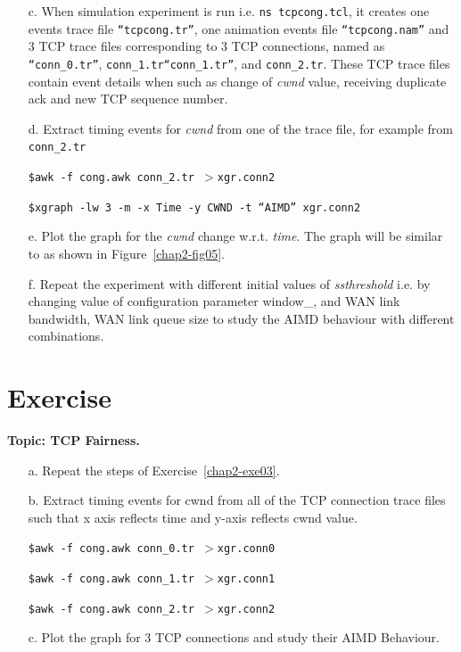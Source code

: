 \begin{multicols}{2}
\begin{itemize}
\item[c.] When simulation experiment is run i.e. \texttt{ns tcpcong.tcl}, it creates one events trace file \texttt{“tcpcong.tr”}, one animation events file \texttt{“tcpcong.nam”} and 3 TCP trace files corresponding to 3 TCP connections, named as \texttt{“conn\_0.tr”}, \texttt{conn\_1.tr“conn\_1.tr”}, and \texttt{conn\_2.tr}. These TCP trace files contain event details when such as change of \textit{cwnd} value, receiving duplicate ack and new TCP sequence number.

\item[d.] Extract timing events for \textit{cwnd} from one of the trace file, for example from \texttt{conn\_2.tr}

\texttt{\$awk -f cong.awk conn\_2.tr $>$xgr.conn2}

\texttt{\$xgraph -lw 3 -m -x Time -y CWND -t ``AIMD” xgr.conn2}

\item[e.] Plot the graph for the \textit{cwnd} change w.r.t. \textit{time}. The graph will be similar to as shown in Figure~\ref{chap2-fig05}.

\item[f.] Repeat the experiment with different initial values of \textit{ssthreshold} i.e. by changing value of configuration parameter window\_, and WAN link bandwidth, WAN link queue size to study the AIMD behaviour with different combinations.
\end{itemize}

\section{Exercise}\label{chap2-exe04}

\textbf{Topic: TCP Fairness.}

\begin{itemize}

\item[a.] Repeat the steps of Exercise~\ref{chap2-exe03}.

\item[b.] Extract timing events for cwnd from all of the TCP connection trace files such that x axis reflects time and y-axis reflects cwnd value.

\texttt{\$awk -f cong.awk conn\_0.tr $>$xgr.conn0}

\texttt{\$awk -f cong.awk conn\_1.tr $>$xgr.conn1}

\texttt{\$awk -f cong.awk conn\_2.tr $>$xgr.conn2}

\item[c.] Plot the graph for 3 TCP connections and study their AIMD Behaviour.


\end{itemize}
\end{multicols}
